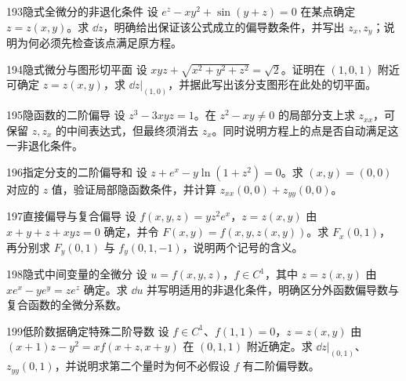 \begin{exercise}{193}{隐式全微分的非退化条件}
设 $e^z-xy^2+\sin(y+z)=0$ 在某点确定 $z=z(x,y)$。求 $\dd z$，明确给出保证该公式成立的偏导数条件，并写出 $z_x,z_y$；说明为何必须先检查该点满足原方程。
\end{exercise}
\begin{exercise}{194}{隐式微分与图形切平面}
设 $xyz+\sqrt{x^2+y^2+z^2}=\sqrt2$。证明在 $(1,0,1)$ 附近可确定 $z=z(x,y)$，求 $\dd z|_{(1,0)}$，并据此写出该分支图形在此处的切平面。
\end{exercise}
\begin{exercise}{195}{隐函数的二阶偏导}
设 $z^3-3xyz=1$。在 $z^2-xy\ne0$ 的局部分支上求 $z_{xx}$，可保留 $z,z_x$ 的中间表达式，但最终须消去 $z_x$。同时说明方程上的点是否自动满足这一非退化条件。
\end{exercise}
\begin{exercise}{196}{指定分支的二阶偏导和}
设 $z+e^x-y\ln(1+z^2)=0$。求 $(x,y)=(0,0)$ 对应的 $z$ 值，验证局部隐函数条件，并计算 $z_{xx}(0,0)+z_{yy}(0,0)$。
\end{exercise}
\begin{exercise}{197}{直接偏导与复合偏导}
设 $f(x,y,z)=yz^2e^x$，$z=z(x,y)$ 由 $x+y+z+xyz=0$ 确定，并令 $F(x,y)=f(x,y,z(x,y))$。求 $F_x(0,1)$，再分别求 $F_y(0,1)$ 与 $f_y(0,1,-1)$，说明两个记号的含义。
\end{exercise}
\begin{exercise}{198}{隐式中间变量的全微分}
设 $u=f(x,y,z)$，$f\in C^1$，其中 $z=z(x,y)$ 由 $xe^x-ye^y=ze^z$ 确定。求 $\dd u$ 并写明适用的非退化条件，明确区分外函数偏导数与复合函数的全微分系数。
\end{exercise}
\begin{exercise}{199}{低阶数据确定特殊二阶导数}
设 $f\in C^1$、$f(1,1)=0$，$z=z(x,y)$ 由 $(x+1)z-y^2=xf(x+z,x+y)$ 在 $(0,1,1)$ 附近确定。求 $\dd z|_{(0,1)}$、$z_{yy}(0,1)$，并说明求第二个量时为何不必假设 $f$ 有二阶偏导数。
\end{exercise}
